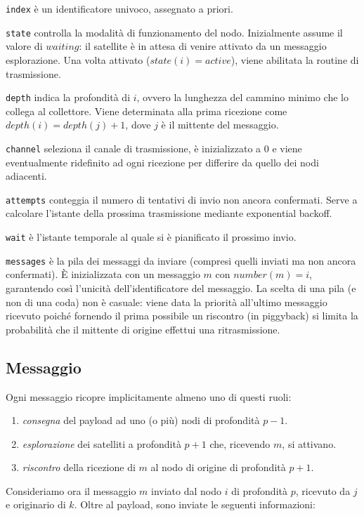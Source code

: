 \documentclass[a4paper,11pt]{article}
\theoremstyle{definition}
\begin{document}
\texttt{index} è un identificatore univoco, assegnato a priori.

\texttt{state} controlla la modalità di funzionamento del nodo. Inizialmente assume il valore di $waiting$: il satellite è in attesa di venire attivato da un messaggio esplorazione. Una volta attivato ($state(i) = active$), viene abilitata la routine di trasmissione.

\texttt{depth} indica la profondità di $i$, ovvero la lunghezza del cammino minimo che lo collega al collettore. Viene determinata alla prima ricezione come $depth(i) = depth(j) + 1$, dove $j$ è il mittente del messaggio.

\texttt{channel} seleziona il canale di trasmissione, è inizializzato a $0$ e viene eventualmente ridefinito ad ogni ricezione per differire da quello dei nodi adiacenti.

\texttt{attempts} conteggia il numero di tentativi di invio non ancora confermati. Serve a calcolare l'istante della prossima trasmissione mediante exponential backoff.

\texttt{wait} è l'istante temporale al quale si è pianificato il prossimo invio.

\texttt{messages} è la pila dei messaggi da inviare (compresi quelli inviati ma non ancora confermati). È inizializzata con un messaggio $m$ con $number(m) = i$, garantendo così l'unicità dell'identificatore del messaggio. La scelta di una pila (e non di una coda) non è casuale: viene data la priorità all'ultimo messaggio ricevuto poiché fornendo il prima possibile un riscontro (in piggyback) si limita la probabilità che il mittente di origine effettui una ritrasmissione.

\subsection{Messaggio}

Ogni messaggio ricopre implicitamente almeno uno di questi ruoli:
\begin{enumerate}
\item \emph{consegna} del payload ad uno (o più) nodi di profondità $p-1$.
\item \emph{esplorazione} dei satelliti a profondità $p+1$ che, ricevendo $m$, si attivano.
\item \emph{riscontro} della ricezione di $m$ al nodo di origine di profondità $p+1$.
\end{enumerate}

Consideriamo ora il messaggio $m$ inviato dal nodo $i$ di profondità $p$, ricevuto da $j$ e originario di $k$. Oltre al payload, sono inviate le seguenti informazioni:
\end{document}
